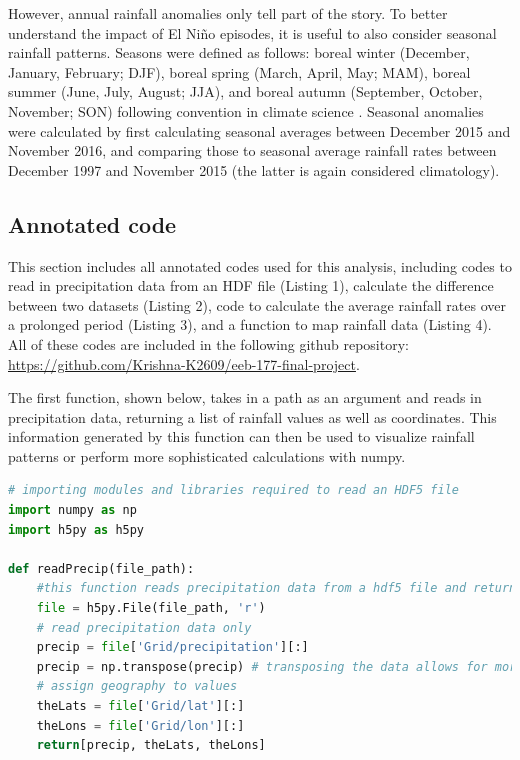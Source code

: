 \documentclass[12pt]{article}
\begin{document}
However, annual rainfall anomalies only tell part of the story. To better understand the impact of El Ni{\~n}o episodes, it is useful to also consider seasonal rainfall patterns. Seasons were defined as follows: boreal winter (December, January, February; DJF), boreal spring (March, April, May; MAM), boreal summer (June, July, August; JJA), and boreal autumn (September, October, November; SON) following convention in climate science \cite{larkin2005global}. Seasonal anomalies were calculated by first calculating seasonal averages between December 2015 and November 2016, and comparing those to seasonal average rainfall rates between December 1997 and November 2015 (the latter is again considered climatology).      
 
\subsection{Annotated code}
This section includes all annotated codes used for this analysis, including codes to read in precipitation data from an HDF file (Listing 1), calculate the difference between two datasets (Listing 2), code to calculate the average rainfall rates over a prolonged period (Listing 3), and a function to map rainfall data (Listing 4). All of these codes are included in the following github repository: \url{https://github.com/Krishna-K2609/eeb-177-final-project}.

The first function, shown below, takes in a path as an argument and reads in precipitation data, returning a list of rainfall values as well as coordinates. This information generated by this function can then be used to visualize rainfall patterns or perform more sophisticated calculations with numpy.\\

\begin{lstlisting}[language=Python, caption=Reading in precipitation data]
# importing modules and libraries required to read an HDF5 file
import numpy as np
import h5py as h5py

def readPrecip(file_path):
    #this function reads precipitation data from a hdf5 file and returns a list with arrays for each of precipitation, latitude and longitude information
    file = h5py.File(file_path, 'r') 
    # read precipitation data only
    precip = file['Grid/precipitation'][:]
    precip = np.transpose(precip) # transposing the data allows for more sophisticated calculations using numpy functionality.
    # assign geography to values
    theLats = file['Grid/lat'][:]
    theLons = file['Grid/lon'][:]
    return[precip, theLats, theLons]
\end{lstlisting}
\end{document}
